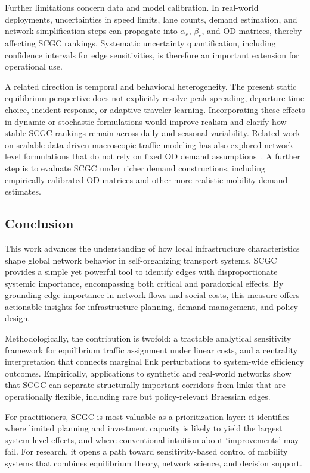 \documentclass[twocolumn,english,groupedaddress, superscriptaddress,aps,pre,10pt,floatfix]{revtex4-2}
\begin{document}
Further limitations concern data and model calibration. In real-world deployments, uncertainties in speed limits, lane counts, demand estimation, and network simplification steps can propagate into $\alpha_e$, $\beta_e$, and OD matrices, thereby affecting SCGC rankings. Systematic uncertainty quantification, including confidence intervals for edge sensitivities, is therefore an important extension for operational use.

A related direction is temporal and behavioral heterogeneity. The present static equilibrium perspective does not explicitly resolve peak spreading, departure-time choice, incident response, or adaptive traveler learning. Incorporating these effects in dynamic or stochastic formulations would improve realism and clarify how stable SCGC rankings remain across daily and seasonal variability. Related work on scalable data-driven macroscopic traffic modeling has also explored network-level formulations that do not rely on fixed OD demand assumptions~\citep{firat2025datadriven}. A further step is to evaluate SCGC under richer demand constructions, including empirically calibrated OD matrices and other more realistic mobility-demand estimates.



\subsection{Conclusion}

This work advances the understanding of how local infrastructure characteristics shape global network behavior in self-organizing transport systems. SCGC provides a simple yet powerful tool to identify edges with disproportionate systemic importance, encompassing both critical and paradoxical effects. By grounding edge importance in network flows and social costs, this measure offers actionable insights for infrastructure planning, demand management, and policy design.

Methodologically, the contribution is twofold: a tractable analytical sensitivity framework for equilibrium traffic assignment under linear costs, and a centrality interpretation that connects marginal link perturbations to system-wide efficiency outcomes. Empirically, applications to synthetic and real-world networks show that SCGC can separate structurally important corridors from links that are operationally flexible, including rare but policy-relevant Braessian edges.

For practitioners, SCGC is most valuable as a prioritization layer: it identifies where limited planning and investment capacity is likely to yield the largest system-level effects, and where conventional intuition about `improvements' may fail. For research, it opens a path toward sensitivity-based control of mobility systems that combines equilibrium theory, network science, and decision support.
\end{document}
